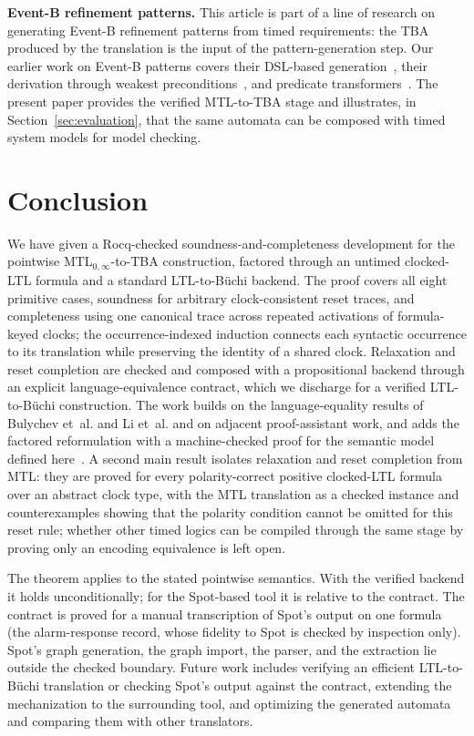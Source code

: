 \documentclass[manuscript]{acmart}
\newcommand{\runinhead}[1]{\par\noindent\textbf{#1}\enspace}
\begin{document}
\runinhead{Event-B refinement patterns.}
This article is part of a line of research on generating Event-B refinement
patterns from timed requirements: the TBA produced by the translation is the
input of the pattern-generation step. Our earlier work on Event-B patterns
covers their DSL-based generation~\cite{fares_abz23}, their derivation through
weakest preconditions~\cite{fares_facs24}, and predicate
transformers~\cite{fares_scp27}. The present paper provides the verified
MTL-to-TBA stage and illustrates, in Section~\ref{sec:evaluation}, that the same
automata can be composed with timed system models for model checking.


\section{Conclusion}
\label{sec:conclusion}
We have given a Rocq-checked soundness-and-completeness development for the
pointwise MTL$_{0,\infty}$-to-TBA construction, factored through an untimed
clocked-LTL formula and a standard LTL-to-B\"uchi backend. The proof covers all
eight primitive cases, soundness for arbitrary clock-consistent reset traces,
and completeness using one canonical trace across repeated activations of
formula-keyed clocks; the occurrence-indexed induction connects each syntactic
occurrence to its translation while preserving the identity of a shared clock.
Relaxation and reset completion are checked and composed with a propositional
backend through an explicit language-equivalence contract, which we discharge
for a verified LTL-to-B\"uchi construction. The work builds on the
language-equality results of Bulychev et~al. and Li et~al. and on adjacent
proof-assistant work, and adds the factored reformulation with a
machine-checked proof for the semantic model defined
here~\cite{li_spin7,xu08,roohi_viswanathan_vmcai18}. A second main result isolates
relaxation and reset completion from MTL: they are proved for every
polarity-correct positive clocked-LTL formula over an abstract clock type, with the MTL translation as a checked
instance and counterexamples showing that the polarity condition cannot be
omitted for this reset rule; whether other
timed logics can be compiled through the same stage by proving only an encoding
equivalence is left open.

The theorem applies to the stated pointwise semantics. With the verified
backend it holds unconditionally; for the Spot-based tool it is
relative to the contract. The contract is proved for a manual
transcription of Spot's output on one formula (the alarm-response record, whose
fidelity to Spot is checked by inspection only). Spot's graph generation,
the graph import, the parser, and the extraction lie outside the checked
boundary.
Future work includes verifying an efficient LTL-to-B\"uchi translation or checking Spot's output
against the contract, extending the mechanization to the surrounding tool, and
optimizing the generated automata and comparing them with other translators.
\end{document}
